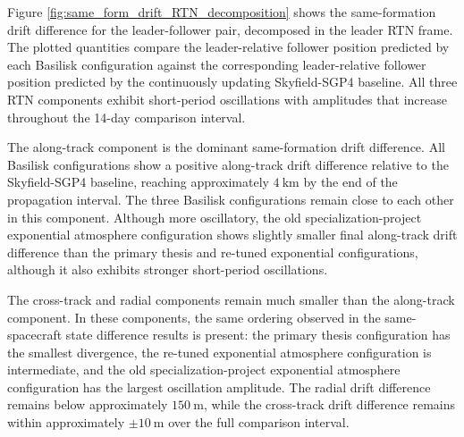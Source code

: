 Figure \ref{fig:same_form_drift_RTN_decomposition} shows the same-formation drift difference for the leader-follower pair, decomposed in the leader RTN frame. The plotted quantities compare the leader-relative follower position predicted by each Basilisk configuration against the corresponding leader-relative follower position predicted by the continuously updating Skyfield-SGP4 baseline. All three RTN components exhibit short-period oscillations with amplitudes that increase throughout the 14-day comparison interval.

The along-track component is the dominant same-formation drift difference. All Basilisk configurations show a positive along-track drift difference relative to the Skyfield-SGP4 baseline, reaching approximately $4~\mathrm{km}$ by the end of the propagation interval. The three Basilisk configurations remain close to each other in this component. Although more oscillatory, the old specialization-project exponential atmosphere configuration shows slightly smaller final along-track drift difference than the primary thesis and re-tuned exponential configurations, although it also exhibits stronger short-period oscillations.

The cross-track and radial components remain much smaller than the along-track component. In these components, the same ordering observed in the same-spacecraft state difference results is present: the primary thesis configuration has the smallest divergence, the re-tuned exponential atmosphere configuration is intermediate, and the old specialization-project exponential atmosphere configuration has the largest oscillation amplitude. The radial drift difference remains below approximately $150~\mathrm{m}$, while the cross-track drift difference remains within approximately $\pm 10~\mathrm{m}$ over the full comparison interval.

